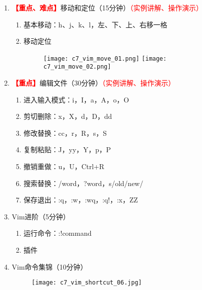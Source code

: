 \documentclass{TIJMUjiaoanLL}
\begin{document}
\begin{enumerate}
  \item \textcolor{red}{\textbf{【重点、难点】}}移动和定位（15分钟）\textcolor{red}{（实例讲解、操作演示）}
    \begin{enumerate}
      \item 基本移动：h、j、k、l，左、下、上、右移一格
      \item 移动定位
    \vspace*{-10pt}
    \begin{figure}[h]
      \centering
      \texttt{[image: c7\_vim\_move\_01.png]}
      \texttt{[image: c7\_vim\_move\_02.png]}
    \end{figure}
    \vspace*{-10pt}

    \end{enumerate}


\otherTail
\newpage
\otherHeader


  \item \textcolor{red}{\textbf{【重点】}}编辑文件（30分钟）\textcolor{red}{（实例讲解、操作演示）}
    \begin{enumerate}
      \item 进入输入模式：i，I，a，A，o，O
      \item 剪切删除：x，X，d，D，dd
      \item 修改替换：cc，r，R，s，S
      \item 复制粘贴：J，yy，Y，p，P
      \item 撤销重做：u，U，Ctrl+R
      \item 搜索替换：/word，?word，s/old/new/
      \item 保存退出：:q，:w，:wq，:q!，:x，ZZ
    \end{enumerate}

  \item Vim进阶（5分钟）
    \begin{enumerate}
      \item 运行命令：:!command
      \item 插件
    \end{enumerate}

  \item Vim命令集锦（10分钟）
    \vspace*{-10pt}
    \begin{figure}[h]
      \centering
      \texttt{[image: c7\_vim\_shortcut\_06.jpg]}
    \end{figure}
    \vspace*{-10pt}


\end{enumerate}
\end{document}
